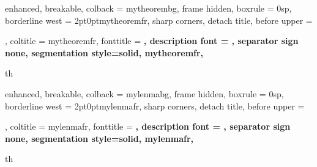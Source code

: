 
{%
	enhanced,
	breakable,
	colback = mytheorembg,
	frame hidden,
	boxrule = 0sp,
	borderline west = {2pt}{0pt}{mytheoremfr},
	sharp corners,
	detach title,
	before upper = \tcbtitle\par\smallskip,
	coltitle = mytheoremfr,
	fonttitle = \bfseries\sffamily,
	description font = \mdseries,
	separator sign none,
	segmentation style={solid, mytheoremfr},
}
{th}


{%
	enhanced,
	breakable,
	colback = mylenmabg,
	frame hidden,
	boxrule = 0sp,
	borderline west = {2pt}{0pt}{mylenmafr},
	sharp corners,
	detach title,
	before upper = \tcbtitle\par\smallskip,
	coltitle = mylenmafr,
	fonttitle = \bfseries\sffamily,
	description font = \mdseries,
	separator sign none,
	segmentation style={solid, mylenmafr},
}
{th}


\newcommand{\thm}[2]{\begin{Theorem*}{#1}{}#2\end{Theorem*}}
\newcommand{\qs}[2]{\begin{question*}{#1}{}#2\end{question*}}
\newcommand{\prp}[2]{\begin{Property*}{#1}{}#2\end{Property*}}
\newcommand{\lemma}[2]{\begin{Lemma*}{#1}{}#2\end{Lemma*}}
